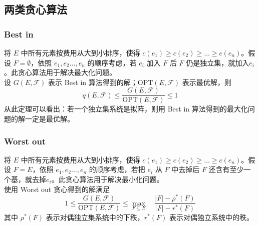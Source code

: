 \subsection{两类贪心算法}
\subsubsection{Best in}
将 $E$ 中所有元素按费用从大到小排序，使得 $c(e_1) \ge c(e_2) \ge ... \ge c(e_n)$。假设 $F = \emptyset$，依照 $e_1, e_2 \dots, e_n$ 的顺序考虑，若 $e_i$ 加入 $F$ 后 $F$ 仍是独立集，就加入$e_i$。此贪心算法用于解决最大化问题。 \\
设 $G(E, \mathcal{F})$ 表示 Best in 算法得到的解；$\text{OPT}(E, \mathcal{F})$ 表示最优解，则 $$q(E, \mathcal{F}) \le \frac{G(E, \mathcal{F})}{\text{OPT}(E, \mathcal{F})} \le 1$$ 从此定理可以看出：若一个独立集系统是拟阵，则用 Best in 算法得到的最大化问题的解一定是最优解。

\subsubsection{Worst out}
将 $E$ 中所有元素按费用从大到小排序，使得 $c(e_1) \ge c(e_2) \ge ... \ge c(e_n)$。假设 $F = E$，依照 $e_1, e_2 \dots, e_n$ 的顺序考虑，若把 $e_i$ 从 $F$ 中去掉后 $F$ 还含有至少一个基，就去掉$e_i$。此贪心算法用于解决最小化问题。 \\
使用 Worst out 贪心得到的解满足 
$$
1 \le \frac{G(E, \mathcal{F})}{\text{OPT}(E, \mathcal{F})} \le \max\limits_{F \subseteq E} \quad \frac{|F| - \rho^*(F)}{|F| - r^*(F)}
$$ 
其中 $\rho^*(F)$ 表示对偶独立集系统中的下秩，$r^*(F)$ 表示对偶独立系统中的秩。

\pagebreak
